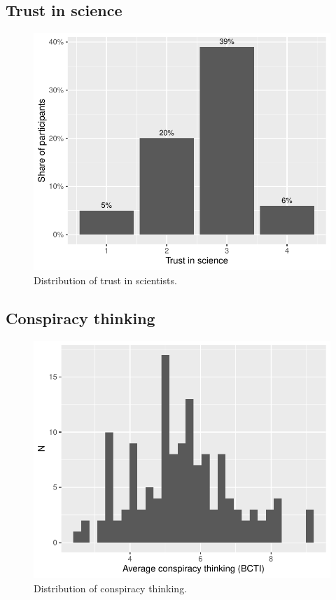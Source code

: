 \documentclass[
  doc,floatsintext]{apa6}
\begin{document}
\subsection{Trust in science}\label{trust-in-science-7}



\begin{figure}
\centering
\includegraphics{output/figures/exp3-trust-scientists.pdf}
\caption{\label{fig:exp3-trust-scientists}Distribution of trust in scientists.}
\end{figure}

\subsection{Conspiracy thinking}\label{conspiracy-thinking-2}



\begin{figure}
\centering
\includegraphics{output/figures/exp3-conspiracy-distribution.pdf}
\caption{\label{fig:exp3-conspiracy-distribution}Distribution of conspiracy thinking.}
\end{figure}
\end{document}
